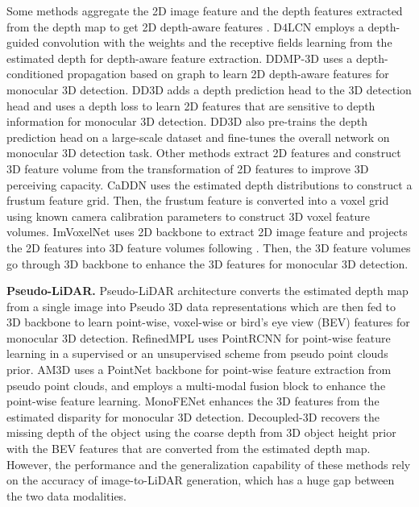 \documentclass[10pt,twocolumn,letterpaper]{article}
\begin{document}
Some methods aggregate the 2D image feature and the depth features extracted from the depth map to get 2D depth-aware features \cite{ding2019learning,park2021pseudo}. D$4$LCN \cite{ding2019learning} employs a depth-guided convolution with the weights and the receptive fields learning from the estimated depth for depth-aware feature extraction. DDMP-3D \cite{wang2021depth} uses a depth-conditioned propagation based on graph to learn 2D depth-aware features for monocular 3D detection. DD3D \cite{park2021pseudo} adds a depth prediction head to the 3D detection head and uses a depth loss to learn 2D features that are sensitive to depth information for monocular 3D detection. DD3D\cite{park2021pseudo} also pre-trains the depth prediction head on a large-scale dataset and fine-tunes the overall network on monocular 3D detection task.
Other methods extract 2D features and construct 3D feature volume from the transformation of 2D features to improve 3D perceiving capacity. CaDDN \cite{reading2021categorical} uses the estimated depth distributions to construct a frustum feature grid. Then, the frustum feature is converted into a voxel grid using known camera calibration parameters to construct 3D voxel feature volumes. ImVoxelNet \cite{rukhovich2021imvoxelnet} uses 2D backbone to extract 2D image feature and projects the 2D features into 3D feature volumes following \cite{murez2020atlas}. Then, the 3D feature volumes go through 3D backbone to enhance the 3D features for monocular 3D detection.

\textbf{Pseudo-LiDAR.} Pseudo-LiDAR architecture converts the estimated depth map from a single image into Pseudo 3D data representations \cite{vianney2019refinedmpl,cai2020monocular} which are then fed to 3D backbone to learn point-wise, voxel-wise or bird's eye view (BEV) features for monocular 3D detection. RefinedMPL \cite{vianney2019refinedmpl} uses PointRCNN \cite{shi2019pointrcnn} for point-wise feature learning in a supervised or an unsupervised scheme from pseudo point clouds prior. AM3D \cite{ma2019accurate} uses a PointNet \cite{qi2017pointnet} backbone for point-wise feature extraction from pseudo point clouds, and employs a multi-modal fusion block to enhance the point-wise feature learning. MonoFENet\cite{bao2019monofenet} enhances the 3D features from the estimated disparity for monocular 3D detection. Decoupled-3D \cite{cai2020monocular} recovers the missing depth of the object using the coarse depth from 3D object height prior with the BEV features that are converted from the estimated depth map. However, the performance and the generalization capability of these methods rely on the accuracy of image-to-LiDAR generation, which has a huge gap between the two data modalities. 
\end{document}
